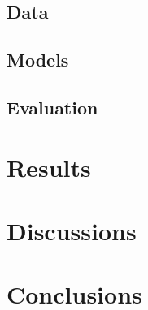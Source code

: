 \documentclass[table, xcdraw, sigconf,review, anonymous]{acmart}
\begin{document}
    \subsection{Data}
    
    \subsection{Models}
    
    \subsection{Evaluation}
    

\section{Results}

\section{Discussions}

\section{Conclusions}
 

% 
% 


 
\end{document}
